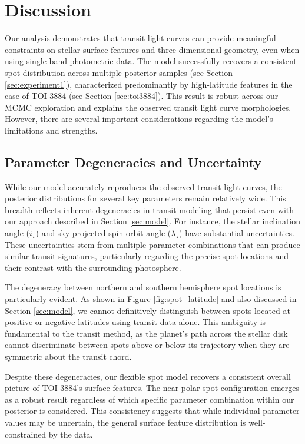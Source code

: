 \documentclass[twocolumn]{aastex631}
\begin{document}
\section{Discussion}
\label{sec:discussion}
Our analysis demonstrates that transit light curves can provide meaningful constraints on stellar surface features and 
three-dimensional geometry, even when using single-band photometric data. The model successfully recovers a consistent spot 
distribution across multiple posterior samples (see Section \ref{sec:experiment1}), characterized predominantly by high-latitude 
features in the case of TOI-3884 (see Section \ref{sec:toi3884}). 
This result is robust across our MCMC exploration and explains the observed transit light curve morphologies. 
However, there are several important considerations regarding the model's limitations and strengths.

\subsection{Parameter Degeneracies and Uncertainty}

While our model accurately reproduces the observed transit light curves, the posterior distributions for several key 
parameters remain relatively wide. This breadth reflects inherent degeneracies in transit modeling that persist even 
with our approach described in Section \ref{sec:model}. For instance, the stellar inclination angle 
($i_\star$) and sky-projected spin-orbit angle 
($\lambda_\star$) have substantial uncertainties. These uncertainties stem 
from multiple parameter combinations that can produce similar transit signatures, particularly regarding the precise spot 
locations and their contrast with the surrounding photosphere.

The degeneracy between northern and southern hemisphere spot locations is particularly evident. As shown in Figure 
\ref{fig:spot_latitude} and also discussed in Section \ref{sec:model}, we cannot definitively distinguish 
between spots located at positive or negative latitudes using 
transit data alone. This ambiguity is fundamental to the transit method, as the planet's path across the stellar disk 
cannot discriminate between spots above or below its trajectory when they are symmetric about the transit chord.

Despite these degeneracies, our flexible spot model recovers a consistent overall picture of TOI-3884's surface features. 
The near-polar spot configuration emerges as a robust result regardless of which specific parameter combination within our 
posterior is considered. This consistency suggests that while individual parameter values may be uncertain, the general 
surface feature distribution is well-constrained by the data.
\end{document}
